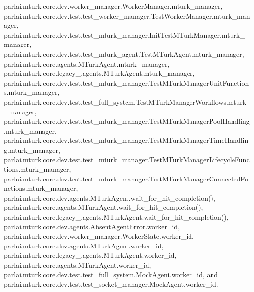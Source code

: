 parlai.\+mturk.\+core.\+dev.\+worker\+\_\+manager.\+Worker\+Manager.\+mturk\+\_\+manager, parlai.\+mturk.\+core.\+dev.\+test.\+test\+\_\+worker\+\_\+manager.\+Test\+Worker\+Manager.\+mturk\+\_\+manager, parlai.\+mturk.\+core.\+dev.\+test.\+test\+\_\+mturk\+\_\+manager.\+Init\+Test\+M\+Turk\+Manager.\+mturk\+\_\+manager, parlai.\+mturk.\+core.\+dev.\+test.\+test\+\_\+mturk\+\_\+agent.\+Test\+M\+Turk\+Agent.\+mturk\+\_\+manager, parlai.\+mturk.\+core.\+agents.\+M\+Turk\+Agent.\+mturk\+\_\+manager, parlai.\+mturk.\+core.\+legacy\+\_.\+agents.\+M\+Turk\+Agent.\+mturk\+\_\+manager, parlai.\+mturk.\+core.\+dev.\+test.\+test\+\_\+mturk\+\_\+manager.\+Test\+M\+Turk\+Manager\+Unit\+Functions.\+mturk\+\_\+manager, parlai.\+mturk.\+core.\+dev.\+test.\+test\+\_\+full\+\_\+system.\+Test\+M\+Turk\+Manager\+Workflows.\+mturk\+\_\+manager, parlai.\+mturk.\+core.\+dev.\+test.\+test\+\_\+mturk\+\_\+manager.\+Test\+M\+Turk\+Manager\+Pool\+Handling.\+mturk\+\_\+manager, parlai.\+mturk.\+core.\+dev.\+test.\+test\+\_\+mturk\+\_\+manager.\+Test\+M\+Turk\+Manager\+Time\+Handling.\+mturk\+\_\+manager, parlai.\+mturk.\+core.\+dev.\+test.\+test\+\_\+mturk\+\_\+manager.\+Test\+M\+Turk\+Manager\+Lifecycle\+Functions.\+mturk\+\_\+manager, parlai.\+mturk.\+core.\+dev.\+test.\+test\+\_\+mturk\+\_\+manager.\+Test\+M\+Turk\+Manager\+Connected\+Functions.\+mturk\+\_\+manager, parlai.\+mturk.\+core.\+dev.\+agents.\+M\+Turk\+Agent.\+wait\+\_\+for\+\_\+hit\+\_\+completion(), parlai.\+mturk.\+core.\+agents.\+M\+Turk\+Agent.\+wait\+\_\+for\+\_\+hit\+\_\+completion(), parlai.\+mturk.\+core.\+legacy\+\_.\+agents.\+M\+Turk\+Agent.\+wait\+\_\+for\+\_\+hit\+\_\+completion(), parlai.\+mturk.\+core.\+dev.\+agents.\+Absent\+Agent\+Error.\+worker\+\_\+id, parlai.\+mturk.\+core.\+dev.\+worker\+\_\+manager.\+Worker\+State.\+worker\+\_\+id, parlai.\+mturk.\+core.\+dev.\+agents.\+M\+Turk\+Agent.\+worker\+\_\+id, parlai.\+mturk.\+core.\+legacy\+\_.\+agents.\+M\+Turk\+Agent.\+worker\+\_\+id, parlai.\+mturk.\+core.\+agents.\+M\+Turk\+Agent.\+worker\+\_\+id, parlai.\+mturk.\+core.\+dev.\+test.\+test\+\_\+full\+\_\+system.\+Mock\+Agent.\+worker\+\_\+id, and parlai.\+mturk.\+core.\+dev.\+test.\+test\+\_\+socket\+\_\+manager.\+Mock\+Agent.\+worker\+\_\+id.

